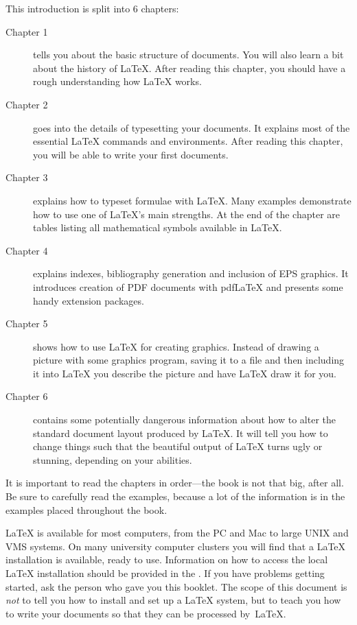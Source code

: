 \bigskip
\noindent This introduction is split into 6 chapters:
\begin{description}
\item[Chapter 1] tells you about the basic structure of \LaTeXe{}
  documents. You will also learn a bit about the history of \LaTeX{}.
  After reading this chapter, you should have a rough understanding how
  \LaTeX{} works.
\item[Chapter 2] goes into the details of typesetting your
  documents. It explains most of the essential \LaTeX{} commands and
  environments. After reading this chapter, you will be able to write
  your first documents. 
\item[Chapter 3] explains how to typeset formulae with \LaTeX. Many
  examples demonstrate how to use one of \LaTeX{}'s
  main strengths. At the end of the chapter are tables listing
  all mathematical symbols available in \LaTeX{}.
\item[Chapter 4] explains indexes,  bibliography generation and
  inclusion of EPS graphics. It introduces creation of PDF documents with pdf\LaTeX{}
  and presents some handy extension packages.
\item[Chapter 5] shows how to use \LaTeX{} for creating graphics. Instead
  of drawing a picture with some graphics program, saving it to a file and
  then including it into \LaTeX{} you describe the picture and have \LaTeX{}
  draw it for you.
\item[Chapter 6] contains some potentially dangerous information about
  how to alter the
  standard document layout produced by \LaTeX{}. It will tell you how  to
  change things such that the beautiful output of \LaTeX{}
  turns ugly or stunning, depending on your abilities.
\end{description}
\bigskip
\noindent It is important to read the chapters in order---the book is
not that big, after all. Be sure to carefully read the examples,
because a lot of the information is in the
examples placed throughout the book.

\bigskip
\noindent \LaTeX{} is available for most computers, from the PC and Mac to large
UNIX and VMS systems. On many university computer clusters you will
find that a \LaTeX{} installation is available, ready to use.
Information on how to access
the local \LaTeX{} installation should be provided in the \guide. If
you have problems getting started, ask the person who gave you this
booklet. The scope of this document is \emph{not} to tell you how to
install and set up a \LaTeX{} system, but to teach you how to write
your documents so that they can be processed by~\LaTeX{}.

